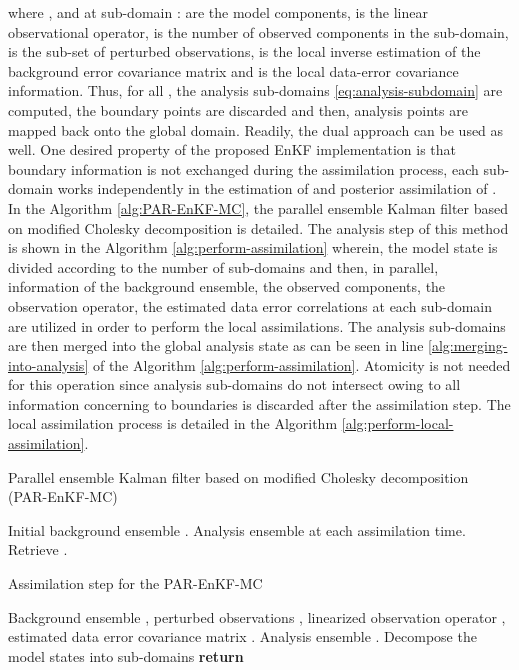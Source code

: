 \documentclass[12pt]{article}
\begin{document}
where , and at sub-domain :  are the model components,  is the linear observational operator,  is the number of observed components in the sub-domain,  is the sub-set of perturbed observations,  is the local inverse estimation of the background error covariance matrix and  is the local data-error covariance information. Thus, for all , the analysis sub-domains \eqref{eq:analysis-subdomain} are computed, the  boundary points are discarded and then,  analysis points are mapped back onto the global domain. Readily, the dual approach can be used as well. One desired property of the proposed EnKF implementation is that boundary information is not exchanged during the assimilation process, each sub-domain works independently in the estimation of  and posterior assimilation of . In the Algorithm \ref{alg:PAR-EnKF-MC}, the parallel ensemble Kalman filter based on modified Cholesky decomposition is detailed. The analysis step of this method is shown in the Algorithm \ref{alg:perform-assimilation} wherein, the model state is divided according to the number of sub-domains  and then, in parallel, information of the background ensemble, the observed components, the observation operator, the estimated data error correlations at each sub-domain are utilized in order to perform the local assimilations. The analysis sub-domains are then merged into the global analysis state as can be seen in line \ref{alg:merging-into-analysis} of the Algorithm \ref{alg:perform-assimilation}. Atomicity is not needed for this operation since analysis sub-domains do not intersect owing to all information concerning to boundaries is discarded after the assimilation step. The local assimilation process is detailed in the Algorithm \eqref{alg:perform-local-assimilation}.
\begin{algorithm}[H]
\caption{Parallel ensemble Kalman filter based on modified Cholesky decomposition (PAR-EnKF-MC)}\label{alg:PAR-EnKF-MC}
\begin{algorithmic}[1]
\Require Initial background ensemble .
\Ensure Analysis ensemble at each assimilation time.
\State Retrieve .
\State 
\State  {}
\For{} 
\State 
\EndFor
\EndWhile
\end{algorithmic}
\end{algorithm}
\begin{algorithm}[H]
\caption{Assimilation step for the PAR-EnKF-MC}\label{alg:perform-assimilation}
\begin{algorithmic}[1]
\Require Background ensemble , perturbed observations , linearized observation operator , estimated data error covariance matrix .
\Ensure Analysis ensemble .
\State Decompose the model states  into  sub-domains
\For{}
\State 
\State 
\State 
\State 
\State 
\State  \label{alg:merging-into-analysis}
\EndFor
\State \textbf{return} 
\EndProcedure \end{algorithmic}
\end{algorithm}
\end{document}
